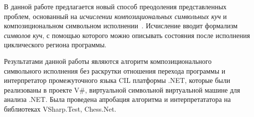 В данной работе предлагается новый способ преодоления представленных проблем, основанный на \emph{исчислении композициональных символьных куч} и композициональном символьном исполнении~\cite{godefroid2007compositional}.
Исчисление вводит формализм \emph{символов куч}, с помощью которого можно описывать состояния после исполнения циклического региона программы.

Результатами данной работы являются алгоритм композиционального символьного исполнения без раскрутки отношения перехода программы и интерпретатор промежуточного языка CIL платформы .NET, которые были
реализованы в проекте V\#, виртуальной символьной виртуальной машине для анализа .NET. Была проведена апробация  алгоритма и интерпретататора на библиотеках \foreignlanguage{english}{VSharp.Test, Chess.Net}.

